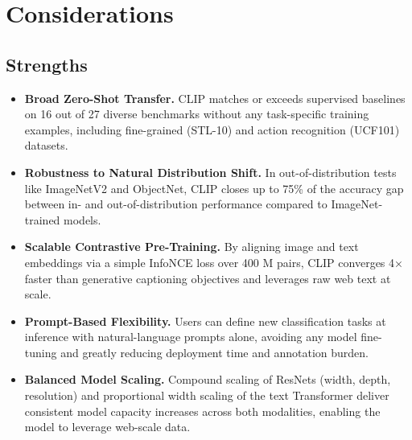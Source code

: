 \documentclass[10pt]{article}
\begin{document}
\section*{Considerations}
\subsection*{Strengths}
\begin{itemize}
    \item \textbf{Broad Zero-Shot Transfer.} CLIP matches or exceeds supervised baselines on 16 out of 27 diverse benchmarks without any task-specific training examples, including fine-grained (STL-10) and action recognition (UCF101) datasets.
    \item \textbf{Robustness to Natural Distribution Shift.} In out-of-distribution tests like ImageNetV2 and ObjectNet, CLIP closes up to 75\% of the accuracy gap between in- and out-of-distribution performance compared to ImageNet-trained models.
    \item \textbf{Scalable Contrastive Pre-Training.} By aligning image and text embeddings via a simple InfoNCE loss over 400 M pairs, CLIP converges 4× faster than generative captioning objectives and leverages raw web text at scale.
    \item \textbf{Prompt-Based Flexibility.} Users can define new classification tasks at inference with natural-language prompts alone, avoiding any model fine-tuning and greatly reducing deployment time and annotation burden.
    \item \textbf{Balanced Model Scaling.} Compound scaling of ResNets (width, depth, resolution) and proportional width scaling of the text Transformer deliver consistent model capacity increases across both modalities, enabling the model to leverage web-scale data.
\end{itemize}
\end{document}
